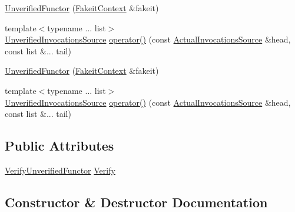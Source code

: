 \begin{DoxyCompactItemize}
\item 
\mbox{\hyperlink{classfakeit_1_1UnverifiedFunctor_a5dcaec59e8d210db88b5600118e51426}{Unverified\+Functor}} (\mbox{\hyperlink{structfakeit_1_1FakeitContext}{Fakeit\+Context}} \&fakeit)
\item 
{\footnotesize template$<$typename ... list$>$ }\\\mbox{\hyperlink{structfakeit_1_1UnverifiedInvocationsSource}{Unverified\+Invocations\+Source}} \mbox{\hyperlink{classfakeit_1_1UnverifiedFunctor_a460588cf559622fd0b9e9b30c5f7c9c9}{operator()}} (const \mbox{\hyperlink{structfakeit_1_1ActualInvocationsSource}{Actual\+Invocations\+Source}} \&head, const list \&... tail)
\item 
\mbox{\hyperlink{classfakeit_1_1UnverifiedFunctor_a5dcaec59e8d210db88b5600118e51426}{Unverified\+Functor}} (\mbox{\hyperlink{structfakeit_1_1FakeitContext}{Fakeit\+Context}} \&fakeit)
\item 
{\footnotesize template$<$typename ... list$>$ }\\\mbox{\hyperlink{structfakeit_1_1UnverifiedInvocationsSource}{Unverified\+Invocations\+Source}} \mbox{\hyperlink{classfakeit_1_1UnverifiedFunctor_a460588cf559622fd0b9e9b30c5f7c9c9}{operator()}} (const \mbox{\hyperlink{structfakeit_1_1ActualInvocationsSource}{Actual\+Invocations\+Source}} \&head, const list \&... tail)
\end{DoxyCompactItemize}
\subsection*{Public Attributes}
\begin{DoxyCompactItemize}
\item 
\mbox{\hyperlink{classfakeit_1_1VerifyUnverifiedFunctor}{Verify\+Unverified\+Functor}} \mbox{\hyperlink{classfakeit_1_1UnverifiedFunctor_a6d1008d910bcbc72afba18ea76f7734a}{Verify}}
\end{DoxyCompactItemize}


\subsection{Constructor \& Destructor Documentation}
\mbox{\label{classfakeit_1_1UnverifiedFunctor_a5dcaec59e8d210db88b5600118e51426}} 
